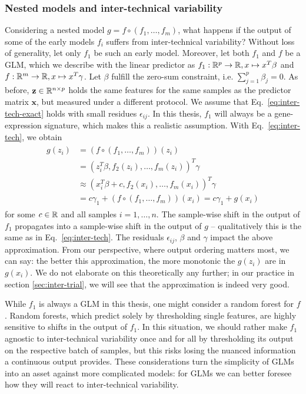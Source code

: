\subsubsection{Nested models and inter-technical variability}

Considering a nested model $g = f \circ (f_1, \ldots, f_m)$, what happens if the output of some of 
the early models $f_i$ suffers from inter-technical variability? Without loss of generality, let 
only $f_1$ be such an early model. Moreover, let both $f_1$ and $f$ be a GLM, which we describe 
with the linear predictor as $f_1: \mathbb{R}^p \to \mathbb{R}, x \mapsto x^T \beta$ and $f: \mathbb{R}^m \to \mathbb{R}, 
x \mapsto x^T \gamma$. Let $\beta$ fulfill the zero-sum constraint, i.e. $\sum_{j=1}^p \beta_j = 0$.
As before, $\mathbf{z} \in \mathbb{R}^{n \times p}$ holds the same features for the same samples as the 
predictor matrix $\mathbf{x}$, but measured under a different protocol.
We assume that Eq.\ \ref{eq:inter-tech-exact} holds with small residues $\epsilon_{ij}$. In this 
thesis, $f_1$ will always be a gene-expression signature, which makes this a realistic assumption. 
With Eq.\ \ref{eq:inter-tech}, we obtain
\begin{align}\label{eq:inter-tech-nested}
\begin{split}
    g(z_i) &= (f \circ (f_1, \ldots, f_m))(z_i) \\ 
    &= (z_i^T \beta, f_2(z_i), \ldots, f_m(z_i))^T \gamma \\
    &\approx (x_i^T \beta + c, f_2(x_i), \ldots, f_m(x_i))^T \gamma \\ 
    &= c \gamma_1 + (f \circ (f_1, \ldots, f_m))(x_i) = c \gamma_1 + g(x_i)
\end{split}
\end{align}
for some $c \in \mathbb{R}$ and all samples $i = 1, \ldots, n$. The sample-wise shift in the output of 
$f_1$ propagates into a sample-wise shift in the output of $g$ -- qualitatively this is the same 
as in Eq.\ \ref{eq:inter-tech}. The residuals $\epsilon_{ij}$, $\beta$ and $\gamma$ impact the 
above approximation. From our 
perspective, where output ordering matters most, we can say: the better this approximation, the more 
monotonic the $g(z_i)$ are in $g(x_i)$. We do not elaborate on this theoretically any further; 
in our practice in section \ref{sec:inter-trial}, we will see that the approximation is indeed
very good.

While $f_1$ is always a GLM in this thesis, one might consider a random forest for $f$. Random 
forests, which predict solely by thresholding single features, are highly sensitive to shifts in 
the output of $f_1$. In this situation, we should rather make $f_1$ agnostic to inter-technical 
variability once and 
for all by thresholding its output on the respective batch of samples, but this risks losing the 
nuanced information a continuous output provides. These considerations turn the simplicity of GLMs 
into an asset against more complicated models: for GLMs we can better foresee how they will react 
to inter-technical variability.


